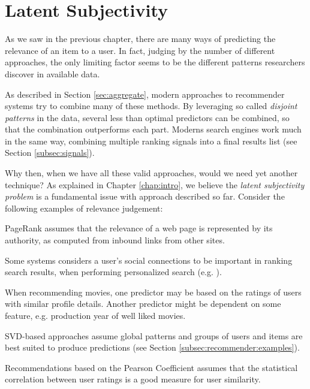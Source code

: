 \section{Latent Subjectivity}
\label{sec:reasoning}

As we saw in the previous chapter, 
there are many ways of predicting the
relevance of an item to a user. 
In fact, judging by the number of different approaches,
the only limiting factor seems to be the different 
patterns researchers discover in available data.

As described in Section \ref{sec:aggregate},
modern approaches to recommender systems try to combine many of these methods.
By leveraging so called \emph{disjoint patterns}
in the data, several less than optimal predictors
can be combined, so that the combination outperforms each part.
Moderns search engines work much in the same way,
combining multiple ranking signals into a final results list
(see Section \ref{subsec:signals}).

Why then, when we have all these valid approaches, would we need yet another technique?
As explained in Chapter \ref{chap:intro}, 
we believe the \emph{latent subjectivity problem}
is a fundamental issue with approach described so far.
Consider the following examples of relevance judgement:

\begin{itemize*}
  \item PageRank \citep{Bender2005} assumes that the relevance of a web page is 
  represented by its authority, as computed from inbound links from other sites.
  \item Some systems considers a user's social connections to be important
  in ranking search results, when performing personalized search (e.g. \cite{Carmel2009}).
  \item When recommending movies, one predictor may be based on the ratings
  of users with similar profile details. Another predictor might be 
  dependent on some feature, e.g. production year of well liked movies.
  \item SVD-based approaches assume global patterns and groups of users and items
  are best suited to produce predictions (see Section \ref{subsec:recommender:examples}).
  \item Recommendations based on the Pearson Coefficient \cite[p11]{Segaran2007}
  assumes that the statistical correlation between user ratings is a good
  measure for user similarity.
\end{itemize*}

